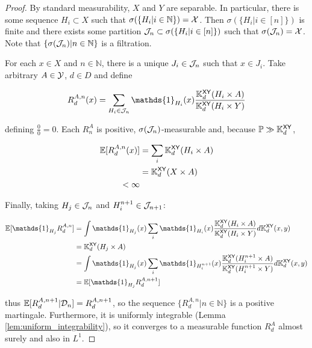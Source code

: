 \begin{proof}
By standard measurability, $X$ and $Y$ are separable. In particular, there is some sequence $H_i\subset X$ such that $\sigma(\{H_i|i\in\mathbb{N}\})=\mathcal{X}$. Then $\sigma(\{H_i|i\in[n]\})$ is finite and there exists some partition $\mathcal{J}_n\subset\sigma(\{H_i|i\in[n]\})$ such that $\sigma(\mathcal{J}_n)=\mathcal{X}$. Note that $\{\sigma(\mathcal{J}_n)|n\in\mathbb{N}\}$ is a filtration.

For each $x\in X$ and $n\in \mathbb{N}$, there is a unique $J_i\in \mathcal{J}_n$ such that $x\in J_i$. Take arbitrary $A\in\mathcal{Y}$, $d\in D$ and define

\begin{align}
	R^{A,n}_d(x) = \sum_{H_i\in \sigalg{J}_n} \mathds{1}_{H_i}(x) \frac{\kernel{K}_{d}^{\RV{XY}}(H_i\times A)}{\kernel{K}_d^{\RV{XY}}(H_i\times Y)}
\end{align} 

defining $\frac{0}{0}=0$. Each $R^A_n$ is positive, $\sigma(\mathcal{J}_n)$-measurable and, because $\mathbb{P}\gg \mathbb{K}_{d}^{\mathsf{XY}}$, 

\begin{align}
	\mathbb{E}[R^{A,n}_d(x)] &= \sum_i \mathbb{K}_d^{\mathsf{XY}}(H_i\times A)\\
	&= \mathbb{K}_d^{\mathsf{XY}}(X\times A)\\
	< \infty
\end{align}

Finally, taking $H_j\in\mathcal{J}_n$ and $H_i^{n+1}\in \mathcal{J}_{n+1}$:

\begin{align}
	\mathbb{E} [\mathds{1}_{H_j} R^{A,n}_d] &= \int \mathds{1}_{H_j} (x) \sum_i  \mathds{1}_{H_i}(x) \frac{\kernel{K}_{d}^{\RV{XY}}(H_i\times A)}{\kernel{K}_{d}^{\RV{XY}}(H_i\times Y)} d\kernel{K}_{d}^{\RV{XY}}(x,y)\\
	 									  &= \kernel{K}_{d}^{\RV{XY}}(H_j\times A) \label{eq:agrement_on_jsub}\\
										  &= \int \mathds{1}_{H_j}(x) \sum_i \mathds{1}_{H^{n+1}_i}(x) \frac{\kernel{K}_{d}^{\RV{XY}}(H^{n+1}_i\times A)}{\kernel{K}_{d}^{\RV{XY}}(H^{n+1}_i\times Y)} d\kernel{K}_{d}^{\RV{XY}}(x,y)\\
										  &= \mathbb{E}[\mathds{1}_{H_j}R^{A,n+1}_d]
\end{align}

thus $\mathbb{E}[R^{A,n+1}_d|\mathcal{D}_n] = R^{A,n+1}_d$, so the sequence $\{R^{A,n}_d|n\in \mathbb{N}\}$ is a positive martingale. Furthermore, it is uniformly integrable (Lemma \ref{lem:uniform_integrability}), so it converges to a measurable function $R^A_d$ almost surely and also in $L^1$. 


\end{proof}
